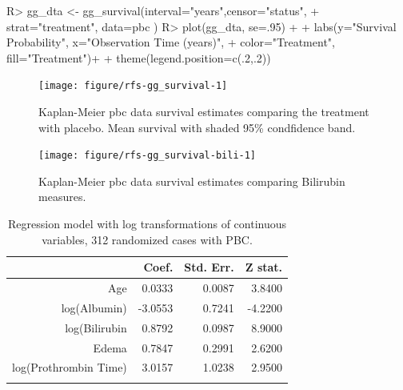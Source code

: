 \documentclass[nojss]{jss}\usepackage[]{graphicx}\usepackage[]{color}
\begin{document}
\begin{Schunk}
\begin{Sinput}
R> gg_dta <- gg_survival(interval="years",censor="status", 
+                       strat="treatment", data=pbc )
R> plot(gg_dta, se=.95) +
+   labs(y="Survival Probability", x="Observation Time (years)", 
+        color="Treatment", fill="Treatment")+
+   theme(legend.position=c(.2,.2))
\end{Sinput}
\begin{figure}[!htpb]

{\centering \texttt{[image: figure/rfs-gg\_survival-1]} 

}

\caption[Kaplan-Meier pbc data survival estimates comparing the treatment with placebo]{Kaplan-Meier pbc data survival estimates comparing the treatment with placebo. Mean survival with shaded 95\% condfidence band.\label{fig:gg_survival}}
\end{figure}
\end{Schunk}

\begin{Schunk}
\begin{figure}[!htpb]

{\centering \texttt{[image: figure/rfs-gg\_survival-bili-1]} 

}

\caption[Kaplan-Meier pbc data survival estimates comparing Bilirubin measures]{Kaplan-Meier pbc data survival estimates comparing Bilirubin measures.\label{fig:gg_survival-bili}}
\end{figure}
\end{Schunk}

\begin{table}[ht]
\centering
{\footnotesize
\begin{tabular}{rrrr}
  \toprule
 & Coef. & Std. Err. & Z stat. \\ 
  \midrule
Age & 0.0333 & 0.0087 & 3.8400 \\ 
   \rowcolor[gray]{0.95}log(Albumin) & -3.0553 & 0.7241 & -4.2200 \\ 
  log(Bilirubin & 0.8792 & 0.0987 & 8.9000 \\ 
   \rowcolor[gray]{0.95}Edema & 0.7847 & 0.2991 & 2.6200 \\ 
  log(Prothrombin Time) & 3.0157 & 1.0238 & 2.9500 \\ 
   \rowcolor[gray]{0.95} \bottomrule
\end{tabular}
}
\caption{Regression model with log transformations of continuous variables, 312 randomized cases with PBC.} 
\label{T:FHmodel}
\end{table}
\end{document}
